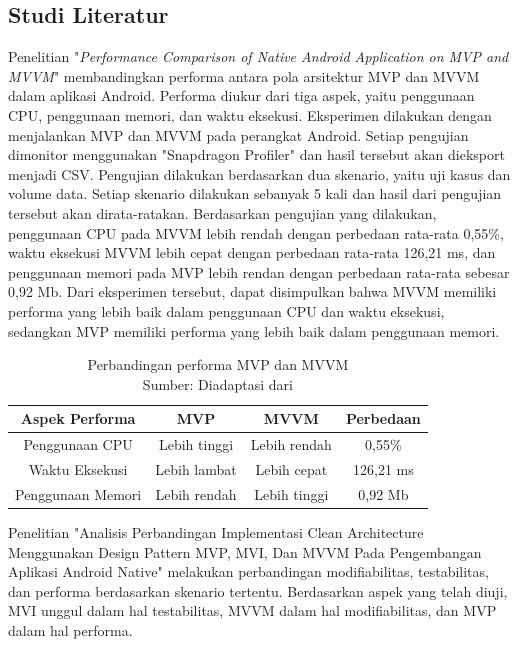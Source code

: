\documentclass[conference]{IEEEtran}
\begin{document}
	\subsection{Studi Literatur}
	Penelitian "\textit{Performance Comparison of Native Android Application on MVP and MVVM}" \cite{Wis2020} membandingkan performa antara pola arsitektur MVP dan MVVM dalam aplikasi Android. Performa diukur dari tiga aspek, yaitu penggunaan CPU, penggunaan memori, dan waktu eksekusi. Eksperimen dilakukan dengan menjalankan MVP dan MVVM pada perangkat Android. Setiap pengujian dimonitor menggunakan "Snapdragon Profiler" dan hasil tersebut akan dieksport menjadi CSV. Pengujian dilakukan berdasarkan dua skenario, yaitu uji kasus dan volume data. Setiap skenario dilakukan sebanyak 5 kali dan hasil dari pengujian tersebut akan dirata-ratakan. Berdasarkan pengujian yang dilakukan, penggunaan CPU pada MVVM lebih rendah dengan perbedaan rata-rata 0,55\%, waktu eksekusi MVVM lebih cepat dengan perbedaan rata-rata 126,21 ms, dan penggunaan memori pada MVP lebih rendan dengan perbedaan rata-rata sebesar 0,92 Mb. Dari eksperimen tersebut, dapat disimpulkan bahwa MVVM memiliki performa yang lebih baik dalam penggunaan CPU dan waktu eksekusi, sedangkan MVP memiliki performa yang lebih baik dalam penggunaan memori.
	
	\begin{table}[h]
		\centering
		\renewcommand{\arraystretch}{2}
		\begin{tabular}{|c|c|c|c|}
			\hline
			\textbf{Aspek Performa} & \textbf{MVP} & \textbf{MVVM} & \textbf{Perbedaan} \\
			\hline
			Penggunaan CPU & Lebih tinggi & Lebih rendah & 0,55\% \\
			\hline
			Waktu Eksekusi & Lebih lambat & Lebih cepat & 126,21 ms \\
			\hline
			Penggunaan Memori & Lebih rendah & Lebih tinggi & 0,92 Mb \\
			\hline
		\end{tabular}
		\newline
		\caption{Perbandingan performa MVP dan MVVM \\
			Sumber: Diadaptasi dari \cite{Wis2020}} 
	\end{table}
 
	Penelitian "Analisis Perbandingan Implementasi Clean Architecture Menggunakan Design Pattern MVP, MVI, Dan MVVM Pada Pengembangan Aplikasi Android Native" \cite{Fir2024} melakukan perbandingan modifiabilitas, testabilitas, dan performa berdasarkan skenario tertentu. Berdasarkan aspek yang telah diuji, MVI unggul dalam hal testabilitas, MVVM dalam hal modifiabilitas, dan MVP dalam hal performa.
 
\end{document}
